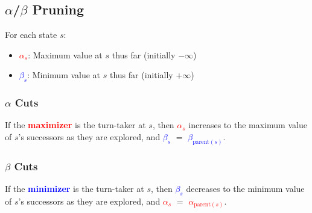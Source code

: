 \subsection{$\alpha$/$\beta$ Pruning}
\begin{definition}
    For each state $s$: 
    \begin{itemize}
        \item \textcolor{red}{$\alpha_s$}: Maximum value at $s$ thus far (initially $-\infty$)
        \item \textcolor{blue}{$\beta_s$}: Minimum value at $s$ thus far (initially $+\infty$)
    \end{itemize}
\end{definition}

\subsubsection{$\alpha$ Cuts}
\begin{notes} If the \textcolor{red}{\textbf{maximizer}} is the turn-taker at $s$, then \textcolor{red}{$\alpha_s$} increases to the maximum value of $s$'s successors as they are explored, and \textcolor{blue}{$\beta_s$} $=$ \textcolor{blue}{$\beta_{\text{parent}(s)}$}.
\end{notes}

\subsubsection{$\beta$ Cuts}
\begin{notes} If the \textcolor{blue}{\textbf{minimizer}} is the turn-taker at $s$, then \textcolor{blue}{$\beta_s$} decreases to the minimum value of $s$'s successors as they are explored, and \textcolor{red}{$\alpha_s$} $=$ \textcolor{red}{$\alpha_{\text{parent}(s)}$}.
\end{notes}
\newpage

